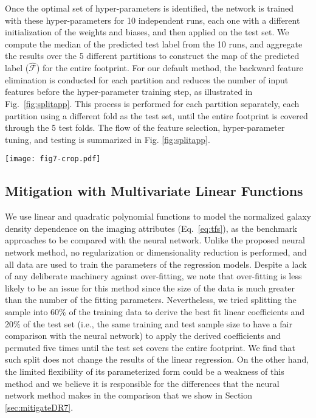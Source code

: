 \documentclass[fleqn, usenatbib]{mnras}
\begin{document}
Once the optimal set of hyper-parameters is identified, the network is trained with these hyper-parameters for 10 independent runs, each one with a different initialization of the weights and biases, and then applied on the test set. We compute the median of the predicted test label from the 10 runs, and aggregate the results over the 5 different partitions to construct the map of the predicted label ($\hat{\mathcal{F}}$) for the entire footprint. For our default method, the backward feature elimination is conducted for each partition and reduces the number of input features before the hyper-parameter training step, as illustrated in Fig.~\ref{fig:splitapp}.  This process is performed for each partition separately, each partition using a different fold as the test set, until the entire footprint is covered through the 5 test folds. The flow of the feature selection, hyper-parameter tuning, and testing is summarized in Fig. \ref{fig:splitapp}.\\

\begin{figure*}
         \centering
         \texttt{[image: fig7-crop.pdf]}
         \caption{A flow-chart of the backward feature elimination and hyper-parameter tuning for each partition. This entire process is performed five times for each of the five partitions/permutations such that the entire footprint is covered by aggregating different testing folds. }
         \label{fig:splitapp}
\end{figure*}

\subsection{Mitigation with Multivariate Linear Functions}
We use linear and quadratic polynomial functions to model the normalized galaxy density dependence on the imaging attributes (Eq.~\ref{eq:tfs}), as the benchmark approaches to be compared with the neural network. Unlike the proposed neural network method, no regularization or dimensionality reduction is performed, and all data are used to train the parameters of the regression models. Despite a lack of any deliberate machinery against over-fitting, we note that over-fitting is less likely to be an issue for this method since the size of the data is much greater than the number of the fitting parameters. Nevertheless, we tried splitting the sample into 60\% of the training data to derive the best fit linear coefficients and 20\% of the test set (i.e., the same training and test sample size to have a fair comparison with the neural network) to apply the derived coefficients and permuted five times until the test set covers the entire footprint. We find that such split does not change the results of the linear regression. On the other hand, the limited flexibility of its parameterized form could be a weakness of this method and we believe it is responsible for the differences that the neural network method makes in the comparison that we show in Section \ref{sec:mitigateDR7}.\\
\end{document}
